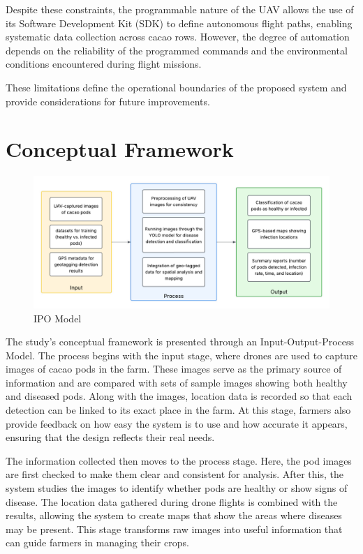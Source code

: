 {Despite these constraints, the programmable nature of the UAV allows the use of its Software Development Kit (SDK) to define autonomous flight paths, enabling systematic data collection across cacao rows. However, the degree of automation depends on the reliability of the programmed commands and the environmental conditions encountered during flight missions.

These limitations define the operational boundaries of the proposed system and provide considerations for future improvements.

\section{Conceptual Framework}

\begin{figure}[H]
	\centering
  \caption{IPO Model}
	\label{fig:ipo}
	\includegraphics[width=1\textwidth]{figures/IPO.pdf}
\end{figure}

The study's conceptual framework is presented through an Input-Output-Process Model. The process begins with the input stage, where drones are used to capture images of cacao pods in the farm. These images serve as the primary source of information and are compared with sets of sample images showing both healthy and diseased pods. Along with the images, location data is recorded so that each detection can be linked to its exact place in the farm. At this stage, farmers also provide feedback on how easy the system is to use and how accurate it appears, ensuring that the design reflects their real needs.

The information collected then moves to the process stage. Here, the pod images are first checked to make them clear and consistent for analysis. After this, the system studies the images to identify whether pods are healthy or show signs of disease. The location data gathered during drone flights is combined with the results, allowing the system to create maps that show the areas where diseases may be present. This stage transforms raw images into useful information that can guide farmers in managing their crops.

}
